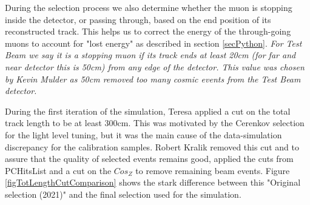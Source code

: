 \documentclass[12pt]{article}
\begin{document}
During the selection process we also determine whether the muon is stopping inside the detector, or passing through, based on the end position of its reconstructed track. This helps us to correct the energy of the through-going muons to account for "lost energy" as described in section \ref{secPython}. \textit{For Test Beam we say it is a stopping muon if its track ends at least 20cm (for far and near detector this is 50cm) from any edge of the detector. This value was chosen by Kevin Mulder \cite{NOVA-doc-39244-v1} as 50cm removed too many cosmic events from the Test Beam detector.} 

During the first iteration of the simulation, Teresa applied a cut on the total track length to be at least 300cm. This was motivated by the Cerenkov selection for the light level tuning, but it was the main cause of the data-simulation discrepancy for the calibration samples. Robert Kralik removed this cut and to assure that the quality of selected events remains good, applied the cuts from PCHitsList and a cut on the $Cos_Z$ to remove remaining beam events. Figure \ref{figTotLengthCutComparison} shows the stark difference between this "Original selection (2021)" and the final selection used for the simulation. 
\end{document}

